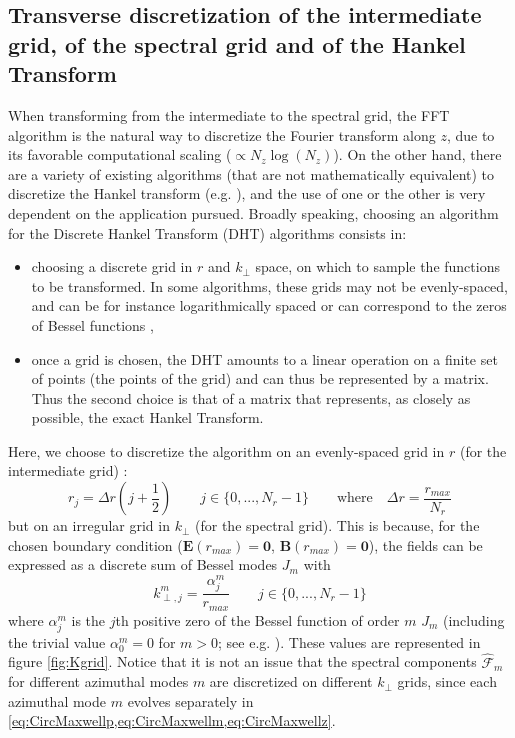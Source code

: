 \documentclass[1p,times]{elsarticle}
\renewcommand{\vec}[1]{\boldsymbol{#1}}
\newcommand{\spectral}[1]{\hat{\mathcal{#1}}}
\begin{document}
\subsection{Transverse discretization of the intermediate grid, 
of the spectral grid and of the Hankel Transform}
\label{sec:discretization}

When transforming from the intermediate to the spectral grid, the FFT
algorithm is the natural way to discretize the Fourier transform along $z$, due to its
favorable computational scaling ($\propto N_z\log(N_z)$).
On the other hand, there are a variety of existing algorithms (that are not mathematically
equivalent) to discretize the Hankel
transform (e.g. \cite{Cree,Yu,Siegman,Guizar,KaiMing}), and the use of one or the other
is very dependent on the application pursued. Broadly
speaking, choosing an algorithm for the Discrete Hankel Transform (DHT)
algorithms consists in:
\begin{itemize}
\item choosing a discrete grid in $r$ and $k_\perp$ space, on which to
  sample the functions to be transformed. In some algorithms, these
  grids may not be evenly-spaced, and can be for instance
  logarithmically spaced \cite{Siegman} or can correspond to the zeros of
  Bessel functions \cite{Yu,Guizar,KaiMing},
\item once a grid is chosen, the DHT amounts to a linear operation on a
  finite set of points (the points of the grid) and can thus be
  represented by a matrix. Thus the second choice is that of a matrix
  that represents, as closely as possible, the exact Hankel Transform.
\end{itemize}
Here, we choose to discretize the algorithm on an evenly-spaced grid in $r$
(for the intermediate grid) :
\begin{equation} 
r_j = \Delta r \left( j+\frac{1}{2} \right) \qquad  j \in \{0, ...,
N_r-1 \} \qquad \mathrm{where} \quad \Delta r = \frac{r_{max}}{N_r} 
\end{equation}
but on an irregular grid in $k_\perp$ (for the spectral grid). This is
because, for the chosen boundary condition
($\vec{E}(r_{max})=\vec{0}$, $\vec{B}(r_{max})=\vec{0}$), the fields
can be expressed as a discrete sum of Bessel modes $J_m$ with 
\begin{equation}  
k^m_{\perp,j} = \frac{\alpha_j^m}{r_{max}} \qquad j \in \{0, ...,
N_r-1 \}
\end{equation}
where $\alpha^m_j$ is the $j$th positive zero of the Bessel function of order
$m$ $J_m$ (including the trivial value $\alpha_0^m=0$ for
$m>0$; see e.g. \cite{Guizar}). 
These values are represented in figure \ref{fig:Kgrid}. Notice
that it is not an issue that the spectral components $\spectral{F}_m$
for different azimuthal modes $m$ are discretized on different
$k_\perp$ grids, since each azimuthal mode $m$ evolves separately in
\cref{eq:CircMaxwellp,eq:CircMaxwellm,eq:CircMaxwellz}.
\end{document}
